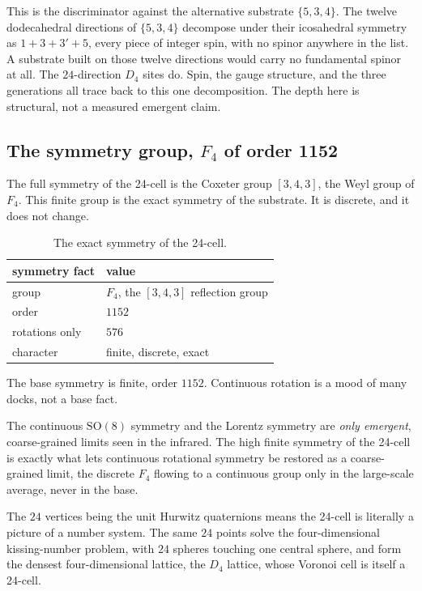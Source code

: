 This is the discriminator against the alternative substrate $\{5,3,4\}$. The twelve dodecahedral directions of $\{5,3,4\}$ decompose under their icosahedral symmetry as $1 + 3 + 3' + 5$, every piece of integer spin, with no spinor anywhere in the list. A substrate built on those twelve directions would carry no fundamental spinor at all. The $24$-direction $D_4$ sites do. Spin, the gauge structure, and the three generations all trace back to this one decomposition. The depth here is structural, not a measured emergent claim.

\subsection{The symmetry group, $F_4$ of order 1152}

The full symmetry of the 24-cell is the Coxeter group $[3,4,3]$, the Weyl group of $F_4$. This finite group is the exact symmetry of the substrate. It is discrete, and it does not change.

\begin{table}[ht]
\centering
\begin{tabular}{@{}ll@{}}
\toprule
symmetry fact & value \\
\midrule
group & $F_4$, the $[3,4,3]$ reflection group \\
order & $1152$ \\
rotations only & $576$ \\
character & finite, discrete, exact \\
\bottomrule
\end{tabular}
\caption{The exact symmetry of the 24-cell.}
\label{tab:f4}
\end{table}

\begin{principle}
The base symmetry is finite, order $1152$. Continuous rotation is a mood of many docks, not a base fact.
\end{principle}

The continuous $\mathrm{SO}(8)$ symmetry and the Lorentz symmetry are \emph{only emergent}, coarse-grained limits seen in the infrared. The high finite symmetry of the 24-cell is exactly what lets continuous rotational symmetry be restored as a coarse-grained limit, the discrete $F_4$ flowing to a continuous group only in the large-scale average, never in the base.

The $24$ vertices being the unit Hurwitz quaternions means the 24-cell is literally a picture of a number system. The same $24$ points solve the four-dimensional kissing-number problem, with $24$ spheres touching one central sphere, and form the densest four-dimensional lattice, the $D_4$ lattice, whose Voronoi cell is itself a 24-cell.

